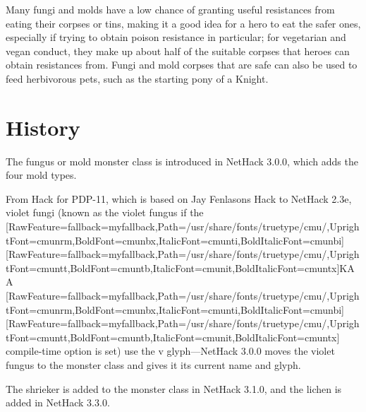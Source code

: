 Many fungi and molds have a low chance of granting useful resistances from eating their corpses or tins, making it a good idea for a hero to eat the safer ones, especially if trying to obtain poison resistance in particular; for vegetarian and vegan conduct\footnotemark[54], they make up about half of the suitable corpses that heroes can obtain resistances from. Fungi and mold corpses that are safe can also be used to feed herbivorous pets, such as the starting pony\footnotemark[55] of a Knight\footnotemark[56].



\section{History}
\label{7}
The fungus or mold monster class is introduced in NetHack 3.0.0\footnotemark[57], which adds the four mold types.


From Hack for PDP-{}11, which is based on Jay Fenlason\textquotesingle{}s Hack\footnotemark[58] to NetHack 2.3e\footnotemark[59], violet fungi (known as the violet fungus if the {\ttfamily \allowbreak{}\setmainfont{cmuntt.ttf}[RawFeature={fallback=myfallback},Path=/usr/share/fonts/truetype/cmu/,UprightFont=cmunrm,BoldFont=cmunbx,ItalicFont=cmunti,BoldItalicFont=cmunbi]\setmonofont{cmuntt.ttf}[RawFeature={fallback=myfallback},Path=/usr/share/fonts/truetype/cmu/,UprightFont=cmuntt,BoldFont=cmuntb,ItalicFont=cmunit,BoldItalicFont=cmuntx]\ttfamily KAA}{$\text{ }$}\allowbreak{}\setmainfont{cmunrm.ttf}[RawFeature={fallback=myfallback},Path=/usr/share/fonts/truetype/cmu/,UprightFont=cmunrm,BoldFont=cmunbx,ItalicFont=cmunti,BoldItalicFont=cmunbi]\setmonofont{cmunrm.ttf}[RawFeature={fallback=myfallback},Path=/usr/share/fonts/truetype/cmu/,UprightFont=cmuntt,BoldFont=cmuntb,ItalicFont=cmunit,BoldItalicFont=cmuntx] compile-{}time option is set) use the v glyph{\mbox{$\text{---}$}}NetHack 3.0.0 moves the violet fungus to the monster class and gives it its current name and glyph.


The shrieker is added to the monster class in NetHack 3.1.0\footnotemark[60], and the lichen is added in NetHack 3.3.0\footnotemark[61].



